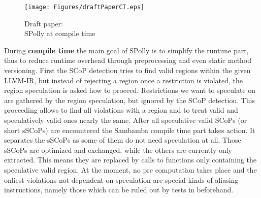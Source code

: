\begin{figure}
  \centering
  \vspace*{-2mm}
  \texttt{[image: Figures/draftPaperCT.eps]}
  \caption{Draft paper: \\SPolly at compile time}
  \vspace*{-5mm}
  \label{fig:draftPaperCT}  
\end{figure}
During \textbf{compile time} the main goal of SPolly is to simplify the runtime part,
thus to reduce runtime overhead through preprocessing and even static method versioning.
First the SCoP detection tries to find valid regions within the given LLVM-IR, 
but instead of rejecting a region once a restriction is violated, 
the region speculation is asked how to proceed. Restrictions we want to speculate
on are gathered by the region speculation, but ignored by the SCoP detection.
This proceeding allows to find all violations with a region and to treat valid and
speculatively valid ones nearly the same. After all  
speculative valid SCoPs (or short sSCoPs) are encountered the Sambamba compile 
time part takes action. It separates the sSCoPs as some of them do not need
speculation at all. Those sSCoPs are optimized and exchanged, 
while the others are currently only extracted. This means they are replaced by
calls to functions only containing the speculative valid region. 
At the moment, no pre computation takes place and the onliest violations 
not dependent on speculation are special kinds of aliasing instructions, 
namely those which can be ruled out by tests in beforehand. 




